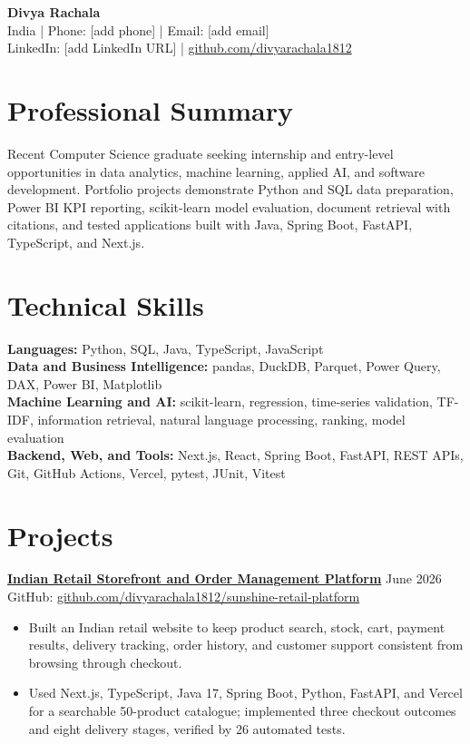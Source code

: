 \documentclass[10pt,a4paper]{article}
\newcommand{\projectheading}[4]{
  \href{#3}{\textbf{#1}} \hfill #2\\
  {\small GitHub: \href{#3}{#4}}\vspace{1pt}
}
\begin{document}
\begin{center}
  {\LARGE\bfseries Divya Rachala}\\[3pt]
  India \enspace | \enspace Phone: [add phone] \enspace | \enspace
  Email: [add email]\\
  LinkedIn: [add LinkedIn URL] \enspace | \enspace
  \href{https://github.com/divyarachala1812}{github.com/divyarachala1812}
\end{center}
\vspace{-6pt}

\section*{Professional Summary}
Recent Computer Science graduate seeking internship and entry-level opportunities in data analytics, machine learning, applied AI, and software development. Portfolio projects demonstrate Python and SQL data preparation, Power BI KPI reporting, scikit-learn model evaluation, document retrieval with citations, and tested applications built with Java, Spring Boot, FastAPI, TypeScript, and Next.js.

\section*{Technical Skills}
\textbf{Languages:} Python, SQL, Java, TypeScript, JavaScript\\
\textbf{Data and Business Intelligence:} pandas, DuckDB, Parquet, Power Query, DAX, Power BI, Matplotlib\\
\textbf{Machine Learning and AI:} scikit-learn, regression, time-series validation, TF-IDF, information retrieval, natural language processing, ranking, model evaluation\\
\textbf{Backend, Web, and Tools:} Next.js, React, Spring Boot, FastAPI, REST APIs, Git, GitHub Actions, Vercel, pytest, JUnit, Vitest

\section*{Projects}

\projectheading{Indian Retail Storefront and Order Management Platform}{June 2026}{https://github.com/divyarachala1812/sunshine-retail-platform}{github.com/divyarachala1812/sunshine-retail-platform}
\begin{itemize}
  \item Built an Indian retail website to keep product search, stock, cart, payment results, delivery tracking, order history, and customer support consistent from browsing through checkout.
  \item Used Next.js, TypeScript, Java 17, Spring Boot, Python, FastAPI, and Vercel for a searchable 50-product catalogue; implemented three checkout outcomes and eight delivery stages, verified by 26 automated tests.
\end{itemize}
\end{document}
